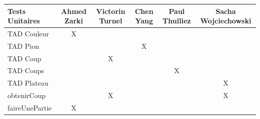 \documentclass{article}
\begin{document}
 \vspace{3cm}
 \begin{tabular}{|l|c|c|c|c|c|}
  Tests Unitaires & Ahmed Zarki & Victorin Turnel & Chen Yang & Paul Thulliez & Sacha Wojciechowski\\
  \hline
  TAD Couleur & X & & & & \\                                                                                                                                                                       
  TAD Pion & & & X & & \\                                                                                                                                                                              
  TAD Coup & & X & &  & \\                                                                                                                                                                              
  TAD Coups & & & & X & \\                                                                                                                                                                             
  TAD Plateau & & & & & X \\
  obtenirCoup & & X & & & X \\
  faireUnePartie & X & & & & \\
  \hline
  
\end{tabular}             
\end{document}
